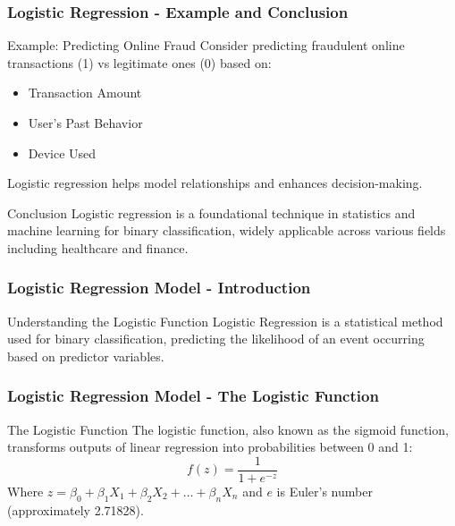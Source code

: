 \documentclass[aspectratio=169]{beamer}
\begin{document}
\begin{frame}[fragile]
    \frametitle{Logistic Regression - Example and Conclusion}
    
    \begin{block}{Example: Predicting Online Fraud}
        Consider predicting fraudulent online transactions (1) vs legitimate ones (0) based on:
        \begin{itemize}
            \item Transaction Amount
            \item User's Past Behavior
            \item Device Used
        \end{itemize}
        Logistic regression helps model relationships and enhances decision-making.
    \end{block}
    
    \begin{block}{Conclusion}
        Logistic regression is a foundational technique in statistics and machine learning for binary classification, widely applicable across various fields including healthcare and finance.
    \end{block}
\end{frame}

\begin{frame}[fragile]
    \frametitle{Logistic Regression Model - Introduction}
    \begin{block}{Understanding the Logistic Function}
        Logistic Regression is a statistical method used for binary classification, predicting the likelihood of an event occurring based on predictor variables.
    \end{block}
\end{frame}

\begin{frame}[fragile]
    \frametitle{Logistic Regression Model - The Logistic Function}
    \begin{block}{The Logistic Function}
        The logistic function, also known as the sigmoid function, transforms outputs of linear regression into probabilities between 0 and 1:
        \begin{equation}
            f(z) = \frac{1}{1 + e^{-z}}
        \end{equation}
        Where \( z = \beta_0 + \beta_1 X_1 + \beta_2 X_2 + \ldots + \beta_n X_n \) and \( e \) is Euler's number (approximately 2.71828).
    \end{block}
\end{frame}
\end{document}

